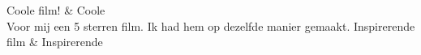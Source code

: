 \begin{appendices}
\begin{table}[]
\begin{tabu}
Coole film!                                                                                                                                                                                                                                                                                                                                                                                                                                                                                                                                                                                                                                                                                                                                                                                                                                                                                                                                                                                                                                                                                                                                                                                                                                                                                                                                                                                                                                                                                     & Coole                                \\ \hline
Voor mij een 5 sterren film. Ik had hem op dezelfde manier gemaakt. Inspirerende film                                                                                                                                                                                                                                                                                                                                                                                                                                                                                                                                                                                                                                                                                                                                                                                                                                                                                                                                                                                                                                                                                                                                                                                                                                                                                                                                                                                                           & Inspirerende                         \\ \hline

\end{tabu}
\end{table}
\end{appendices}
